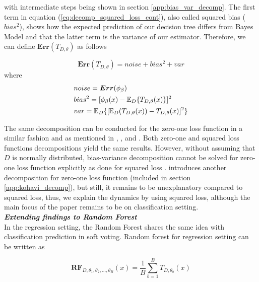 with intermediate steps being shown in section \ref{app:bias_var_decomp}.
The first term in equation (\ref{eq:decomp_squared_loss_cont}), also called squared bias ($bias^2$),
shows how the expected prediction of our decision tree differs from Bayes Model 
and that the latter term is the variance of our estimator. 
Therefore, we can define $\boldsymbol{Err}(T_{D,\theta})$ as follows

\begin{equation}
\boldsymbol{Err}(T_{D,\theta}) = noise + bias^2 + var
\end{equation}
\vspace{-3mm}
\qquad \qquad \qquad \quad where
\vspace{-6.3mm}
\begin{align}
& noise = \boldsymbol{Err}(\phi_{\beta}) \notag \\
& bias^2 = [\phi_{\beta}(x) - \mathbb{E}_{D}\{T_{D,\theta}(x)\}]^2 \notag \\
& var = \mathbb{E}_{D}\{[\mathbb{E}_{D}(T_{D,\theta}(x)) - T_{D,\theta}(x)]^2\} \notag
\end{align}

The same decomposition can be conducted for the zero-one loss function in a similar fashion and as mentioned in 
\cite{louppe2014understanding}, \cite{domingos2000decomposition}, 
\cite{james2003variance} and \cite{friedman1997zeroLoss}.
Both zero-one and squared loss functions decompositions yield the same results. 
However, without assuming that $D$ is normally distributed, bias-variance decomposition 
cannot be solved for zero-one loss function explicitly as done for squared loss \cite{louppe2014understanding}. 
\cite{kohavi1996bias} introduces another decomposition for zero-one loss function (included in section \ref{app:kohavi_decomp}), 
but still, it remains to be unexplanatory compared to squared loss, thus, 
we explain the dynamics by using squared loss, although the main focus of the paper remains to be on classification setting.
\vspace{2mm}
\\
\textbf{\emph{Extending findings to Random Forest }}\\
In the regression setting, the Random Forest shares the same idea with classification prediction in soft voting. 
Random forest for regression setting can be written as

\begin{equation}
\boldsymbol{RF}_{D, \theta_{1},\theta_{2},..., \theta_{B}}(x) = \dfrac{1}{B}\sum_{b = 1}^{B}T_{D,\theta_{b}}(x)
\end{equation}

